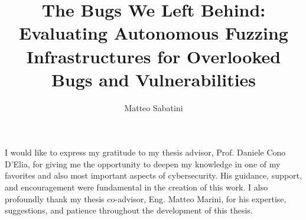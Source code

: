 \documentclass[binding=0.6cm, oneside]{sapthesis}%
\title{The Bugs We Left Behind: Evaluating Autonomous Fuzzing Infrastructures for Overlooked Bugs and Vulnerabilities}
\author{Matteo Sabatini}
\begin{document}
\frontmatter
\maketitle

\begin{acknowledgments}
I would like to express my gratitude to my thesis advisor, Prof. Daniele Cono D'Elia, for giving me the opportunity to deepen my knowledge in one of my favorites and also most important aspects of cybersecurity. His guidance, support, and encouragement were fundamental in the creation of this work.
\newline \newline
I also profoundly thank my thesis co-advisor, Eng. Matteo Marini, for his expertise, suggestions, and patience throughout the development of this thesis.
\end{acknowledgments}
\end{document}
